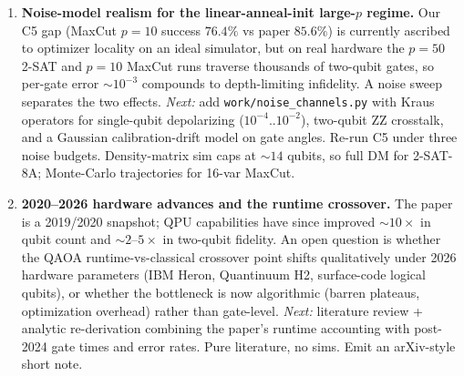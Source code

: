 \begin{enumerate}
\item \textbf{Noise-model realism for the linear-anneal-init large-$p$ regime.}
Our C5 gap (MaxCut $p{=}10$ success $76.4\%$ vs paper $85.6\%$) is currently
ascribed to optimizer locality on an ideal simulator, but on real hardware
the $p{=}50$ 2-SAT and $p{=}10$ MaxCut runs traverse thousands of two-qubit
gates, so per-gate error $\sim 10^{-3}$ compounds to depth-limiting infidelity.
A noise sweep separates the two effects.
\emph{Next:} add \texttt{work/noise\_channels.py} with Kraus operators for
single-qubit depolarizing ($10^{-4}..10^{-2}$), two-qubit ZZ crosstalk, and a
Gaussian calibration-drift model on gate angles. Re-run C5 under three noise
budgets. Density-matrix sim caps at $\sim 14$ qubits, so full DM for 2-SAT-8A;
Monte-Carlo trajectories for 16-var MaxCut.

\item \textbf{2020--2026 hardware advances and the runtime crossover.}
The paper is a 2019/2020 snapshot; QPU capabilities have since improved
$\sim 10\times$ in qubit count and $\sim 2$--$5\times$ in two-qubit fidelity.
An open question is whether the QAOA runtime-vs-classical crossover point
shifts qualitatively under 2026 hardware parameters (IBM Heron, Quantinuum
H2, surface-code logical qubits), or whether the bottleneck is now algorithmic
(barren plateaus, optimization overhead) rather than gate-level.
\emph{Next:} literature review + analytic re-derivation combining the paper's
runtime accounting with post-2024 gate times and error rates. Pure
literature, no sims. Emit an arXiv-style short note.

\end{enumerate}
